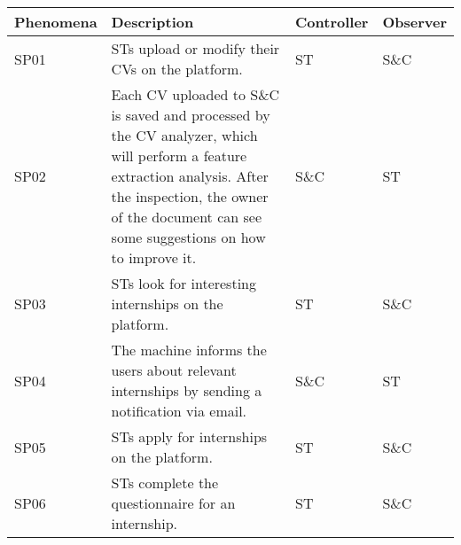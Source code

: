 \begin{longtable}{|l|p{}|l|l|}
    \hline
    \textbf{Phenomena} & \textbf{Description}                                                                                                                                                                                                                                  & \textbf{Controller} & \textbf{Observer} \\
    \hline \hline
    SP01               & STs upload or modify their CVs on the platform.                                                                                                                                                                                                       & ST                  & S\&C              \\
    \hline
    SP02               & Each CV uploaded to S\&C is saved and processed by the CV analyzer, which will perform a feature extraction analysis. After the inspection, the owner of the document can see some suggestions on how to improve it.                                  & S\&C                & ST                \\
    \hline
    SP03               & STs look for interesting internships on the platform.                                                                                                                                                                                                 & ST                  & S\&C              \\
    \hline
    SP04               & The machine informs the users about relevant internships by sending a notification via email.                                                                                                                                                         & S\&C                & ST                \\
    \hline
    SP05               & STs apply for internships on the platform.                                                                                                                                                                                                            & ST                  & S\&C              \\
    \hline
    SP06               & STs complete the questionnaire for an internship.                                                                                                                                                                                                     & ST                  & S\&C              \\

\end{longtable}
